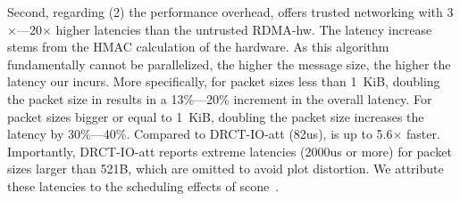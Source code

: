 Second, regarding (2) the \projecttitle{} performance overhead, \projecttitle{} offers trusted networking with 3$\times$---20$\times$ higher latencies than the untrusted RDMA-hw. 
The latency increase stems from the HMAC calculation of the \projecttitle{} hardware. As this algorithm fundamentally cannot be parallelized, the higher the message size, the higher the latency our \projecttitle{} incurs. More specifically, for packet sizes less than 1~KiB, doubling the packet size in \projecttitle{} results in a 13\%---20\% increment in the overall latency. For packet sizes bigger or equal to 1~KiB, doubling the packet size increases the latency by 30\%---40\%. 
Compared to DRCT-IO-att (82us), \projecttitle{} is up to 5.6$\times$ faster. Importantly, DRCT-IO-att reports extreme latencies (2000us or more) for packet sizes larger than 521B, which are omitted to avoid plot distortion. We attribute these latencies to the scheduling effects of {\sc scone}~\cite{scone}. 


% 
% 


